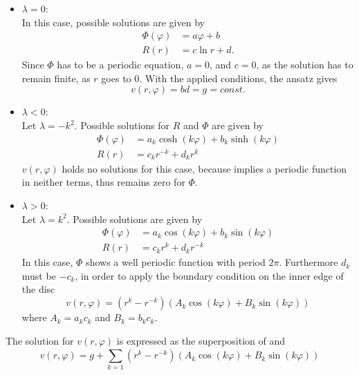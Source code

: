 \begin{itemize}
	\item {\boldmath$\lambda = 0$}: \\
		In this case, possible solutions are given by\\
		\begin{align}
			\Phi(\varphi)&= a \varphi + b\\
			R(r)         &= c \ln{r} + d
			\text{.}
		\end{align}
		Since $\Phi$ has to be a periodic equation, $a = 0$, and $c = 0$, as the solution has to remain finite, as $r$ goes to 0.
		With the applied conditions, the ansatz gives
		\begin{equation}
			\label{eq:vLambda1}
			v(r, \varphi) = b d = g = const.
		\end{equation}
%
	\item {\boldmath$\lambda < 0$}: \\
		Let $\lambda = -k^2$.
		Possible solutions for $R$ and $\Phi$ are given by
		\begin{align}
		\label{eq:phiLambda2}
			\Phi(\varphi)&= a_k \cosh{(k\varphi)} + b_k \sinh{(k\varphi)}\\
			R(r)         &= c_k r^{-k} + d_k r^{k}
		\end{align}
		$v(r,\varphi)$ holds no solutions for this case, because  implies a periodic function in neither terms, thus remains zero for $\Phi$.
%
	\item {\boldmath$\lambda > 0$}: \\
		Let $\lambda = k^2$.
		Possible solutions are given by
		\begin{align}
		\label{eq:phiLambda3}
			\Phi(\varphi)&= a_k \cos{(k\varphi)} + b_k \sin{(k\varphi)}\\
			R(r)         &= c_k r^{k} + d_k r^{-k}
		\end{align}
		In this case, $\Phi$ shows a well periodic function with period $2\pi$.
		Furthermore $d_k$ must be $-c_k$, in order to apply the boundary condition on the inner edge of the disc
		\begin{equation}
		\label{eq:vLambda3}
			v(r, \varphi) = (r^k - r^{-k}) \left( A_k \cos{(k \varphi)} + B_k \sin(k \varphi)\right)
		\end{equation}
		where $A_k = a_k c_k$ and $B_k = b_k c_k$.
\end{itemize}
The solution for $v(r, \varphi)$ is expressed as the superposition of  and 
\begin{equation}
	v(r, \varphi) = g + \sum_{k=1}^{} (r^k - r^{-k}) \left( A_k \cos{(k \varphi)} + B_k \sin(k \varphi)\right)
\end{equation}
